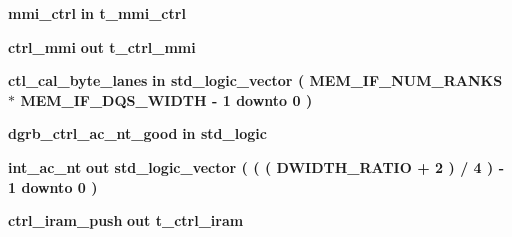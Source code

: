 \begin{DoxyCompactItemize}
\item 
{\bf mmi\+\_\+ctrl}  {\bfseries {\bfseries \textcolor{keywordflow}{in}\textcolor{vhdlchar}{ }}} {\bfseries {\bfseries {\bf t\+\_\+mmi\+\_\+ctrl}} \textcolor{vhdlchar}{ }} 
\item 
{\bf ctrl\+\_\+mmi}  {\bfseries {\bfseries \textcolor{keywordflow}{out}\textcolor{vhdlchar}{ }}} {\bfseries {\bfseries {\bf t\+\_\+ctrl\+\_\+mmi}} \textcolor{vhdlchar}{ }} 
\item 
{\bf ctl\+\_\+cal\+\_\+byte\+\_\+lanes}  {\bfseries {\bfseries \textcolor{keywordflow}{in}\textcolor{vhdlchar}{ }}} {\bfseries \textcolor{comment}{std\+\_\+logic\+\_\+vector}\textcolor{vhdlchar}{ }\textcolor{vhdlchar}{(}\textcolor{vhdlchar}{ }\textcolor{vhdlchar}{ }\textcolor{vhdlchar}{ }\textcolor{vhdlchar}{ }{\bfseries {\bf M\+E\+M\+\_\+\+I\+F\+\_\+\+N\+U\+M\+\_\+\+R\+A\+N\+KS}} \textcolor{vhdlchar}{$\ast$}\textcolor{vhdlchar}{ }\textcolor{vhdlchar}{ }\textcolor{vhdlchar}{ }{\bfseries {\bf M\+E\+M\+\_\+\+I\+F\+\_\+\+D\+Q\+S\+\_\+\+W\+I\+D\+TH}} \textcolor{vhdlchar}{-\/}\textcolor{vhdlchar}{ } \textcolor{vhdldigit}{1} \textcolor{vhdlchar}{ }\textcolor{keywordflow}{downto}\textcolor{vhdlchar}{ }\textcolor{vhdlchar}{ } \textcolor{vhdldigit}{0} \textcolor{vhdlchar}{ }\textcolor{vhdlchar}{)}\textcolor{vhdlchar}{ }} 
\item 
{\bf dgrb\+\_\+ctrl\+\_\+ac\+\_\+nt\+\_\+good}  {\bfseries {\bfseries \textcolor{keywordflow}{in}\textcolor{vhdlchar}{ }}} {\bfseries \textcolor{comment}{std\+\_\+logic}\textcolor{vhdlchar}{ }} 
\item 
{\bf int\+\_\+ac\+\_\+nt}  {\bfseries {\bfseries \textcolor{keywordflow}{out}\textcolor{vhdlchar}{ }}} {\bfseries \textcolor{comment}{std\+\_\+logic\+\_\+vector}\textcolor{vhdlchar}{ }\textcolor{vhdlchar}{(}\textcolor{vhdlchar}{ }\textcolor{vhdlchar}{(}\textcolor{vhdlchar}{ }\textcolor{vhdlchar}{(}\textcolor{vhdlchar}{ }\textcolor{vhdlchar}{ }\textcolor{vhdlchar}{ }\textcolor{vhdlchar}{ }{\bfseries {\bf D\+W\+I\+D\+T\+H\+\_\+\+R\+A\+T\+IO}} \textcolor{vhdlchar}{+}\textcolor{vhdlchar}{ } \textcolor{vhdldigit}{2} \textcolor{vhdlchar}{ }\textcolor{vhdlchar}{)}\textcolor{vhdlchar}{ }\textcolor{vhdlchar}{/}\textcolor{vhdlchar}{ } \textcolor{vhdldigit}{4} \textcolor{vhdlchar}{ }\textcolor{vhdlchar}{)}\textcolor{vhdlchar}{ }\textcolor{vhdlchar}{-\/}\textcolor{vhdlchar}{ } \textcolor{vhdldigit}{1} \textcolor{vhdlchar}{ }\textcolor{keywordflow}{downto}\textcolor{vhdlchar}{ }\textcolor{vhdlchar}{ } \textcolor{vhdldigit}{0} \textcolor{vhdlchar}{ }\textcolor{vhdlchar}{)}\textcolor{vhdlchar}{ }} 
\item 
{\bf ctrl\+\_\+iram\+\_\+push}  {\bfseries {\bfseries \textcolor{keywordflow}{out}\textcolor{vhdlchar}{ }}} {\bfseries {\bfseries {\bf t\+\_\+ctrl\+\_\+iram}} \textcolor{vhdlchar}{ }} 
\end{DoxyCompactItemize}


